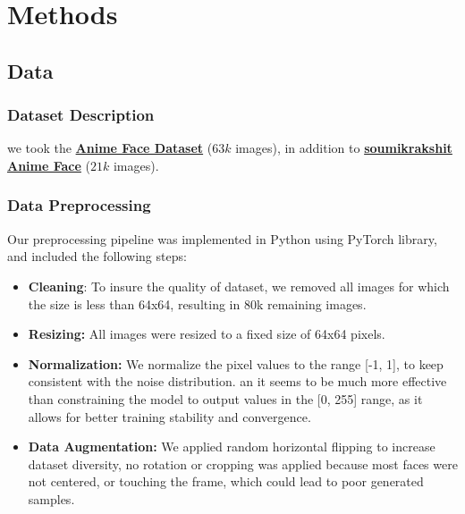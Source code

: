 \documentclass[twocolumn,superscriptaddress,aps]{revtex4-1}
\begin{document}
\section{Methods}
\subsection{Data}
\subsubsection{Dataset Description}

we took the \href{https://www.kaggle.com/datasets/splcher/animefacedataset/}{\textbf{Anime Face Dataset}} ($63k$ images), in addition to \href{https://www.kaggle.com/datasets/soumikrakshit/anime-faces}{\textbf{soumikrakshit Anime Face}} ($21k$ images).

\subsubsection{Data Preprocessing}
Our preprocessing pipeline was implemented in Python using PyTorch library, and included the following steps:

\begin{itemize}
    \item \textbf{Cleaning}: To insure the quality of dataset, we removed all images for which the size is less than 64x64, resulting in 80k remaining images.
    \item \textbf{Resizing:} All images were resized to a fixed size of 64x64 pixels.
    \item \textbf{Normalization:} We normalize the pixel values to the range [-1, 1], to keep consistent with the noise distribution. an it seems to be much more effective than constraining the model to output values in the [0, 255] range, as it allows for better training stability and convergence.
    \item \textbf{Data Augmentation:} We applied random horizontal flipping to increase dataset diversity, no rotation or cropping was applied because most faces were not centered, or touching the frame, which could lead to poor generated samples.
\end{itemize}
\end{document}
